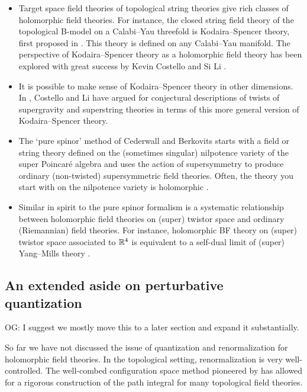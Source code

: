 \documentclass[11pt]{amsart}
\def\owen#1{{\textcolor{violet!50!black}{OG: {#1}}}}
\begin{document}
\begin{itemize}
\item Target space field theories of topological string theories give rich classes of holomorphic field theories. 
For instance, the closed string field theory of the topological B-model on a Calabi--Yau threefold is Kodaira--Spencer theory, first proposed in \cite{BCOV}. 
This theory is defined on any Calabi--Yau manifold. 
The perspective of Kodaira--Spencer theory as a holomorphic field theory has been explored with great success by Kevin Costello and Si Li \cite{CL1, CL2, CL3}.
\item
It is possible to make sense of Kodaira--Spencer theory in other dimensions.
In \cite{CLsugra}, Costello and Li have argued for conjectural descriptions of twists of supergravity and superstring theories in terms of this more general version of Kodaira--Spencer theory.
\item The `pure spinor' method of Cederwall and Berkovits \cite{Cederwall, Berkovits} starts with a field or string theory defined on the (sometimes singular) nilpotence variety of the super Poincar\'e algebra and uses the action of supersymmetry to produce ordinary (non-twisted) supersymmetric field theories. 
Often, the theory you start with on the nilpotence variety is holomorphic \cite{ESW,SWpure}. 
\item Similar in spirit to the pure spinor formalism is a systematic relationship between holomorphic field theories on (super) twistor space and ordinary (Riemannian) field theories.
For instance, holomorphic BF theory on (super) twistor space associated to $\mathbb R^4$ is equivalent to a self-dual limit of (super) Yang--Mills theory \cite{Penrose, Kevins work..., other twistor literature}.
\end{itemize}

\subsection{An extended aside on perturbative quantization}

\owen{I suggest we mostly move this to a later section and expand it substantially.}

So far we have not discussed the issue of quantization and renormalization for holomorphic field theories.
In the topological setting, renormalization is very well-controlled.
The well-combed configuration space method pioneered by \cite{} has allowed for a rigorous construction of the path integral for many topological field theories. 
\end{document}
